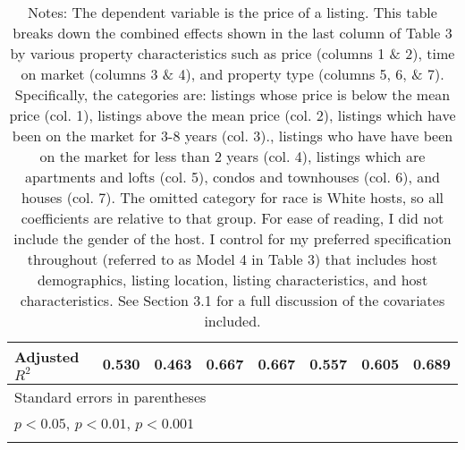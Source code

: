 {\begin{longtable}{l*{7}{c}}
Adjusted \(R^{2}\)  &       0.530         &       0.463         &       0.667         &       0.667         &       0.557         &       0.605         &       0.689         \\
\hline\hline
\multicolumn{8}{l}{\footnotesize Standard errors in parentheses}\\
\multicolumn{8}{l}{\footnotesize \sym{*} \(p<0.05\), \sym{**} \(p<0.01\), \sym{***} \(p<0.001\)}\\
\caption*{Notes:  The dependent variable is the price of a listing. This table breaks down the combined effects shown in the last column of Table 3 by various property characteristics such as price (columns 1 \& 2), time on market (columns 3 \& 4), and property type (columns 5, 6, \& 7). Specifically, the categories are: listings whose price is below the mean price (col. 1), listings above the mean price (col. 2), listings which have been on the market for 3-8 years (col. 3)., listings who have have been on the market for less than 2 years (col. 4), listings which are apartments and lofts (col. 5), condos and townhouses (col. 6), and houses (col. 7). The omitted category for race is White hosts, so all coefficients are relative to that group. For ease of reading, I did not include the gender of the host. I control for my preferred specification throughout (referred to as Model 4 in Table 3) that includes host demographics, listing location, listing characteristics, and host characteristics. See Section 3.1 for a full discussion of the covariates included. }

\end{longtable}
}


